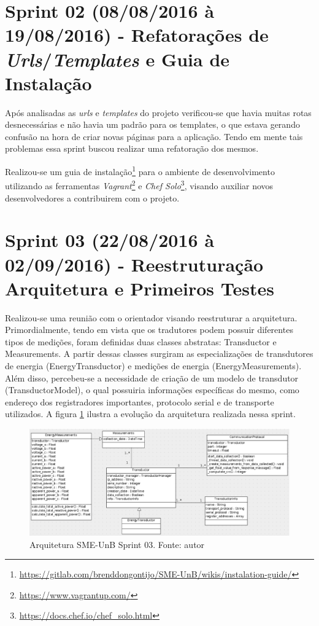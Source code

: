 \vfill
\pagebreak

\section{Sprint 02 (08/08/2016 à 19/08/2016) - Refatorações de \textit{Urls}/\textit{Templates} e Guia de Instalação}
Após analisadas as \textit{urls} e \textit{templates} do projeto verificou-se que havia muitas rotas desnecessárias e não havia um padrão para os templates, o que estava gerando confusão na hora de criar novas páginas para a aplicação. Tendo em mente tais problemas essa sprint buscou realizar uma refatoração dos mesmos.

Realizou-se um guia de instalação\footnote{\url{https://gitlab.com/brenddongontijo/SME-UnB/wikis/instalation-guide/}} para o ambiente de desenvolvimento utilizando as ferramentas \textit{Vagrant}\footnote{\url{https://www.vagrantup.com/}} e \textit{Chef Solo}\footnote{\url{https://docs.chef.io/chef_solo.html}}, visando auxiliar novos desenvolvedores a contribuirem com o projeto.

\section{Sprint 03 (22/08/2016 à 02/09/2016) - Reestruturação Arquitetura e Primeiros Testes}
Realizou-se uma reunião com o orientador visando reestruturar a arquitetura. Primordialmente, tendo em vista que os tradutores podem possuir diferentes tipos de medições, foram definidas duas classes abstratas: Transductor e Measurements. A partir dessas classes surgiram as especializações de transdutores de energia (EnergyTransductor) e medições de energia (EnergyMeasurements). Além disso, percebeu-se a necessidade de criação de um modelo de transdutor (TransductorModel), o qual possuiria informações específicas do mesmo, como endereço dos registradores importantes, protocolo serial e de transporte utilizados. A figura \ref{sprint03arq} ilustra a evolução da arquitetura realizada nessa sprint.

\begin{figure}[!htpb]
    \centering
    \includegraphics[scale=0.6,angle=90]{figuras/sprint03arq.eps}
    \caption{Arquitetura SME-UnB Sprint 03. Fonte: autor}
    \label{sprint03arq}
\end{figure}

